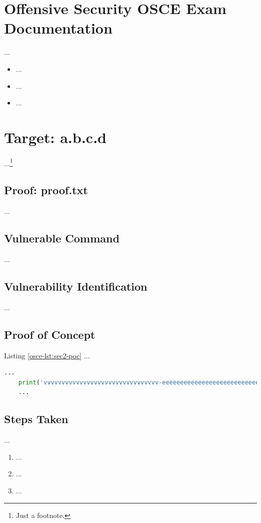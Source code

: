 %
%
%
\section{Offensive Security OSCE Exam Documentation}\label{osce-sec:sec1}
%
...

\begin{itemize}
    \item ...
    \item ...
    \item ...
\end{itemize}
%
%
%
\section{Target: a.b.c.d}\label{osce-sec:sec2}
%
...\footnote{Just a footnote.}
%
%
%
\subsection{Proof: proof.txt}\label{osce-sec:sec2-proof}
%
...
%
%
%
\subsection{Vulnerable Command}\label{osce-sec:sec2-vulncmd}
%
...
%
%
%
\subsection{Vulnerability Identification}\label{osce-sec:sec2-vulnid}
%
...
%
%
%
\subsection{Proof of Concept}\label{osce-sec:sec2-poc}
%
Listing \ref{osce-lst:sec2-poc} ...\\

\begin{lstlisting}[language=Python,caption={Proof of Concept}, label={osce-lst:sec2-poc}]
    ...
    print('vvvvvvvvvvvvvvvvvvvvvvvvvvvvvvvv-eeeeeeeeeeeeeeeeeeeeeeeeeeeeeeeeeeeeeeeeeee-looooooooooooooooooooooong-striiiiiiiiiiiiiing')
    ...
\end{lstlisting}
%
%
%
\subsection{Steps Taken}\label{osce-sec:sec2-steps}
%
...

\begin{enumerate}
    \item ...
    \item ...
    \item ...
\end{enumerate}
%
%
%
